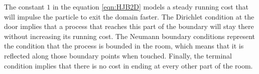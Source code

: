 The constant $1$ in the equation \eqref{eqn:HJB2D} models a steady running cost that will impulse the particle to exit the domain faster. The Dirichlet condition at the door implies that a process that reaches this part of the boundary will stay there without increasing its running cost. The Neumann boundary conditions represent the condition that the process is bounded in the room, which means that it is reflected along those boundary points when touched. Finally, the terminal condition implies that there is no cost in ending at every other part of the room. 


